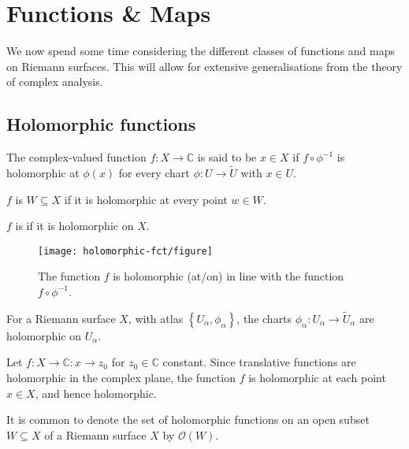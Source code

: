 \chapter{Functions \& Maps}
\begin{chout}
	We now spend some time considering the different classes of functions and maps
	on Riemann surfaces. This will allow for extensive generalisations from the
	theory of complex analysis.
\end{chout}

\section{Holomorphic functions}
\begin{definition}[Holomorphicity]
	The complex-valued function $ f:X \to \mathbb{C} $ is said to be
	 $ x \in X $ if $ f \circ \phi ^{-1} $ is holomorphic at
	$ \phi(x) $ for every chart $ \phi: U \to \tilde{U} $ with $ x \in U $.

	$ f $ is  $ W \subseteq X $ if it is holomorphic at
	every point $ w \in W $.

	$ f $ is  if it is holomorphic on $ X $.
\end{definition}

\begin{figure*}
	\centering
	\texttt{[image: holomorphic-fct/figure]}
	\caption{The function $ f $ is holomorphic (at/on) in line with the function $ f
			\circ \phi ^{-1} $.}
\end{figure*}

\begin{example}
	For a Riemann surface $ X $, with atlas $ \left\{ U _{\alpha}, \phi _{\alpha}
		\right\} $, the charts $ \phi _{\alpha}: U _{\alpha} \to \tilde{U} _{\alpha} $
	are holomorphic on $ U _{\alpha} $.
\end{example}

\begin{example}\label{ex:holo-C-algebra-1}
	Let $ f:X \to \mathbb{C}:x \to z_0 $ for $ z_0 \in \mathbb{C} $ constant. Since
	translative functions are holomorphic in the complex plane, the function $ f $
	is holomorphic at each point $ x \in X $, and hence holomorphic.
\end{example}

\begin{notation}
	It is common to denote the set of holomorphic functions on an open subset $ W
		\subseteq X $ of a Riemann surface $ X $ by $ \mathcal{O}(W) $.
\end{notation}

